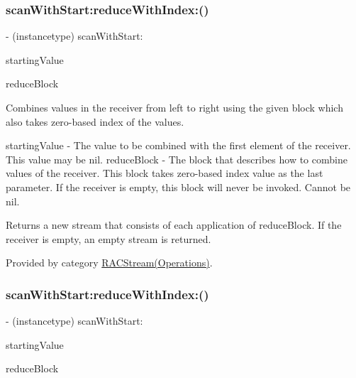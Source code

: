 \subsubsection{\texorpdfstring{scan\+With\+Start\+:reduce\+With\+Index\+:()}{scanWithStart:reduceWithIndex:()}\hspace{0.1cm}{\footnotesize\ttfamily [2/3]}}
{\footnotesize\ttfamily -\/ (instancetype) scan\+With\+Start\+: \begin{DoxyParamCaption}\item[{(id)}]{starting\+Value }\item[{reduceWithIndex:(id($^\wedge$)(id running, id next, N\+S\+U\+Integer index))}]{reduce\+Block }\end{DoxyParamCaption}}

Combines values in the receiver from left to right using the given block which also takes zero-\/based index of the values.

starting\+Value -\/ The value to be combined with the first element of the receiver. This value may be {\ttfamily nil}. reduce\+Block -\/ The block that describes how to combine values of the receiver. This block takes zero-\/based index value as the last parameter. If the receiver is empty, this block will never be invoked. Cannot be nil.

Returns a new stream that consists of each application of {\ttfamily reduce\+Block}. If the receiver is empty, an empty stream is returned. 

Provided by category \mbox{\hyperlink{category_r_a_c_stream_07_operations_08_a69cedeb6e96a6d4154f2256fdcbe27b1}{R\+A\+C\+Stream(\+Operations)}}.

\mbox{\label{interface_r_a_c_stream_a69cedeb6e96a6d4154f2256fdcbe27b1}} 
\subsubsection{\texorpdfstring{scan\+With\+Start\+:reduce\+With\+Index\+:()}{scanWithStart:reduceWithIndex:()}\hspace{0.1cm}{\footnotesize\ttfamily [3/3]}}
{\footnotesize\ttfamily -\/ (instancetype) scan\+With\+Start\+: \begin{DoxyParamCaption}\item[{(id)}]{starting\+Value }\item[{reduceWithIndex:(id($^\wedge$)(id running, id next, N\+S\+U\+Integer index))}]{reduce\+Block }\end{DoxyParamCaption}}

